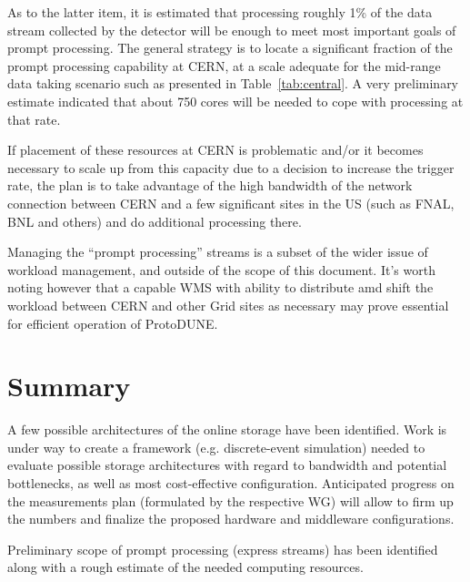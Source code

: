 \documentclass[pdftex,12pt,letter]{article}
\newcommand{\pd}{ProtoDUNE\xspace}
\begin{document}
\noindent As to the latter item, it is estimated that processing roughly 1\% of the data stream collected by the detector will
be enough to meet most important goals of prompt processing. 
The general strategy is to locate a significant fraction of the prompt processing capability at CERN, at a scale adequate for the mid-range
data taking scenario such as presented in Table\, \ref{tab:central}. A very preliminary estimate indicated that about 750 cores
will be needed to cope with processing at that rate.

If placement of these resources at CERN is problematic and/or it becomes necessary to scale up from
this capacity due to a decision to increase the trigger rate,
the plan is to take advantage of the high bandwidth of the network connection between
CERN and a few significant sites in the US (such as FNAL, BNL and others) and do additional processing there.

Managing the ``prompt processing'' streams is a subset of the wider issue of workload management, and outside of
the scope of this document. It's worth noting however that a capable WMS with ability to distribute amd shift the
workload between CERN and other Grid sites as necessary may prove essential for efficient operation of \pd.

\section{Summary}
 A few possible architectures of the online storage have been identified.
Work is under way to create a framework (e.g. discrete-event simulation) needed to evaluate possible storage architectures
with regard to bandwidth and potential bottlenecks, as well as most cost-effective configuration.
Anticipated progress on the measurements plan (formulated by the respective WG) will allow
to firm up the numbers and finalize the proposed hardware and middleware configurations.

Preliminary scope of prompt processing (express streams) has been identified along with a rough estimate of the needed
computing resources.


\end{document}
